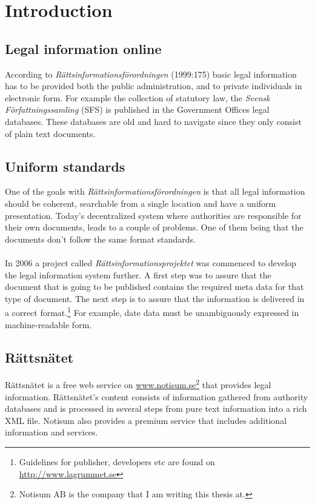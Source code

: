 \chapter{Introduction}
\section{Legal information online}

According to \textit{Rättsinformationsförordningen} (1999:175) basic legal information has to be provided both the public administration, and to private individuals in electronic form. For example the collection of statutory law, the \textit{Svensk Författningssamling} (SFS) is published in the Government Offices legal databases. These databases are old and hard to navigate since they only consist of plain text documents.

\section{Uniform standards}
One of the goals with \textit{Rättsinformationsförordningen} is that all legal information should be coherent, 
searchable from a single location and have a uniform presentation. Today’s decentralized system where 
authorities are responsible for their own documents, leads to a couple of problems. One of them being that 
the documents don’t follow the same format standards.\\\\ 
In 2006 a project called \textit{Rättsinformationsprojektet} was commenced to develop the legal information system further. 
A first step was to assure that the document that is going to be published contains the required meta data 
for that type of document. The next step is to assure that the information is delivered in a correct format.\footnote{Guidelines for publisher, developers etc are found on \url{http://www.lagrummet.se}} For example, date data must be unambiguously expressed in machine-readable form. 

\section{Rättsnätet} Rättsnätet is a free web service on
\url{www.notisum.se}\footnote{Notisum AB is the company that I am writing this thesis at.} that provides legal
information. Rättsnätet’s content consists of information gathered from
authority databases and is processed in several steps from pure text information
into a rich XML file. Notisum also provides a premium service that includes
additional information and services.

